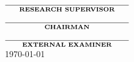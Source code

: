 \documentclass[12pt, a4paper, oneside]{Thesis} %
\newcommand\tline[2]{$\underset{\text{#1}}{\text{\underline{\hspace{#2}}}}$}
\begin{document}
\begin{titlepage}
\begin{center}
 \tline{\bf{RESEARCH SUPERVISOR}}{2in} \\[2cm]
 \tline{\bf{CHAIRMAN}}{2in} \\[2cm]
 \tline{\bf{EXTERNAL EXAMINER}}{2in}\\[2cm]
 




{\large \today}%
 

\end{center}
\end{titlepage}

\end{document}
